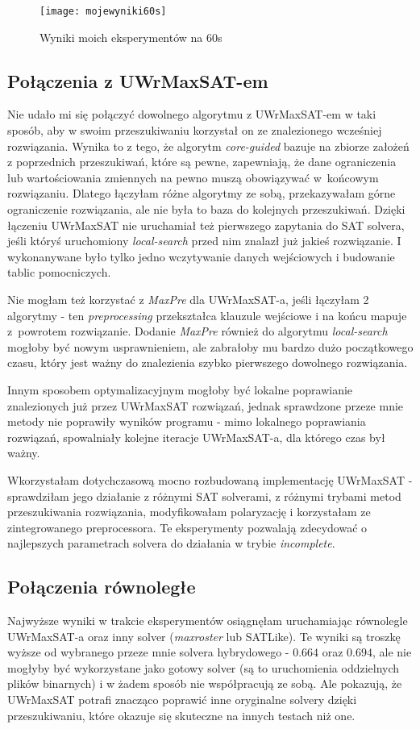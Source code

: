\documentclass[shortabstract]{iithesis}
\begin{document}
\begin{figure}[h]
\begin{center}
	\texttt{[image: mojewyniki60s]}
\end{center}
\caption{Wyniki moich eksperymentów na 60s}
\end{figure}
\subsection{Połączenia z UWrMaxSAT-em}
Nie udało mi się połączyć dowolnego algorytmu z UWrMaxSAT-em w taki sposób, aby w swoim przeszukiwaniu korzystał on ze znalezionego wcześniej rozwiązania. Wynika to z tego, że algorytm \textit{core-guided} bazuje na zbiorze założeń z poprzednich przeszukiwań, które są pewne, zapewniają, że dane ograniczenia lub wartościowania zmiennych na pewno muszą obowiązywać w~końcowym rozwiązaniu.
Dlatego łączyłam różne algorytmy ze sobą, przekazywałam górne ograniczenie rozwiązania, ale nie była to baza do kolejnych przeszukiwań. Dzięki łączeniu UWrMaxSAT nie uruchamiał też pierwszego zapytania do SAT solvera, jeśli któryś uruchomiony \textit{local-search} przed nim znalazł już jakieś rozwiązanie. I wykonanywane było tylko jedno wczytywanie danych wejściowych i budowanie tablic pomocniczych.

Nie mogłam też korzystać z \textit{MaxPre} dla UWrMaxSAT-a, jeśli łączyłam 2 algorytmy - ten \textit{preprocessing} przekształca klauzule wejściowe i na końcu mapuje z~powrotem rozwiązanie. Dodanie \textit{MaxPre} również do algorytmu \textit{local-search} mogłoby być nowym usprawnieniem, ale zabrałoby mu bardzo dużo początkowego czasu, który jest ważny do znalezienia szybko pierwszego dowolnego rozwiązania.

Innym sposobem optymalizacyjnym mogłoby być lokalne poprawianie znalezionych już przez UWrMaxSAT rozwiązań, jednak sprawdzone przeze mnie metody nie poprawiły wyników programu - mimo lokalnego poprawiania rozwiązań, spowalniały kolejne iteracje UWrMaxSAT-a, dla którego czas był ważny. 

Wkorzystałam dotychczasową mocno rozbudowaną implementację UWrMaxSAT - sprawdziłam jego działanie z różnymi SAT solverami, z różnymi trybami metod przeszukiwania rozwiązania, modyfikowałam polaryzację i korzystałam ze zintegrowanego preprocessora. Te eksperymenty pozwalają zdecydować o najlepszych parametrach solvera do działania w trybie \textit{incomplete}.

\subsection{Połączenia równoległe}
Najwyższe wyniki w trakcie eksperymentów osiągnęłam uruchamiając równolegle UWrMaxSAT-a oraz inny solver (\textit{maxroster} lub SATLike). Te wyniki są troszkę wyższe od wybranego przeze mnie solvera hybrydowego - $0.664$ oraz $0.694$, ale nie mogłyby być wykorzystane jako gotowy solver (są to uruchomienia oddzielnych plików binarnych) i w żadem sposób nie współpracują ze sobą. Ale pokazują, że UWrMaxSAT potrafi znacząco poprawić inne oryginalne solvery dzięki przeszukiwaniu, które okazuje się skuteczne na innych testach niż one. 
\end{document}
